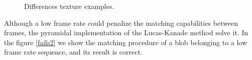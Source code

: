 \begin{figure}[H]
		
\centering

\caption{Differences texture examples.}
\label{Fails1}
\end{figure}


Although a low frame rate could penalize the matching capabilities between frames, the pyramidal implementation of the Lucas-Kanade method solve it. In the figure \ref{fails2} we show the matching procedure of a blob belonging to a low frame rate sequence, and its result is correct.


